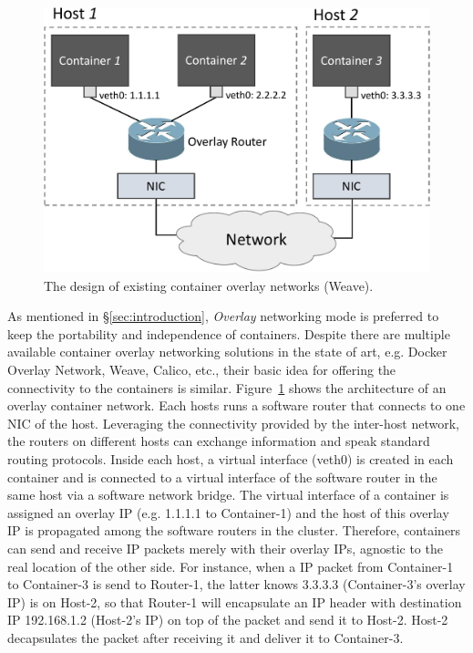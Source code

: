 \begin{figure}[h]  
	\centering   
	\includegraphics[width=0.8\linewidth]{figures/overlay.pdf}   
	\caption{\label{fig:overlay} The design of existing container overlay networks (Weave).}   
\end{figure}   

As mentioned in \S\ref{sec:introduction}, {\em Overlay} networking mode 
is preferred to keep the portability and independence of containers.
Despite there are multiple available container overlay networking solutions
in the state of art, e.g. Docker Overlay Network, Weave, Calico, etc., 
their basic idea for offering the connectivity to the containers is similar.
Figure~\ref{fig:overlay} shows the architecture of an overlay container network.
Each hosts runs a software router that connects to one NIC of the host. 
Leveraging the connectivity provided by the inter-host network, the routers
on different hosts can exchange information and speak standard routing protocols.
Inside each host, a virtual interface (veth0) is created in each container and is connected to a virtual interface of the software router in the same host via a software network bridge. The virtual interface of a container is assigned
an overlay IP (e.g. 1.1.1.1 to Container-1) and the host of this overlay IP
is propagated among the software routers in the cluster. Therefore, containers
can send and receive IP packets merely with their overlay IPs, agnostic to
the real location of the other side. For instance, when a IP packet from
Container-1 to Container-3 is send to Router-1, the latter knows 3.3.3.3
(Container-3's overlay IP) is on Host-2, so that Router-1 will encapsulate 
an IP header with destination IP 192.168.1.2 (Host-2's IP) on top of the packet
and send it to Host-2. Host-2 decapsulates the packet after receiving it
and deliver it to Container-3.  

